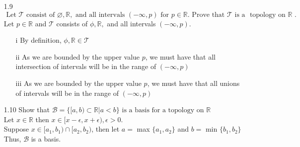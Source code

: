 \documentclass[12pt]{article}
\begin{document}
\begin{enumerate}
	\item[1.9]$ \text { Let } \mathcal { T } \text { consist of } \varnothing, \mathbb { R } , \text { and all intervals } ( - \infty , p ) \text { for } p \in \mathbb { R } . \text { Prove that } \mathcal { T } \text { is a } \text { topology on } \mathbb { R } \text { . } $\\
	Let $ p \in \mathbb{ R } $ and $ \mathcal{ T } $ consists of $ \phi,\mathbb{R}, $ and all intervals $ (-\infty,p) $. 
	\begin{enumerate}
		\item[i] By definition, $ \phi,\mathbb{ R } \in \mathcal{ T } $
		\item[ii] As we are bounded by the upper value $ p $, we must have that all intersection of intervals will be in the range of $ (-\infty,p) $
		\item[iii] As we are bounded by the upper value $ p $, we must have that all unions of intervals will be in the range of $ (-\infty,p) $
	\end{enumerate}
	
	\item[1.10] Show that $ \mathcal { B } = \{ [ a , b ) \subset \mathbb{ R } | a < b \} \text { is a basis for a topology on } \mathbb { R } $\\
		Let $ x\in \mathbb{ R } $ then $ x\in [x-\epsilon,x+\epsilon),\epsilon > 0 $.\\
		Suppose $ x\in [a_1,b_1)\cap[a_2,b_2) $, then let $ a = $ max $ \{a_1,a_2\} $ and $ b = $ min $ \{b_1,b_2\} $\\
		Thus, $ \mathcal{ B } $ is a basis.
	

\end{enumerate}
\end{document}
